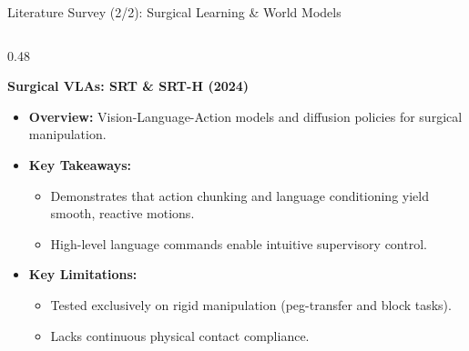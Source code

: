 \documentclass{if-beamer}
\begin{document}
\begin{frame}{Literature Survey (2/2): Surgical Learning \& World Models}
    \begin{columns}[T]
        \begin{column}{0.48\textwidth}
            \begin{block}{\textbf{Surgical VLAs: SRT \& SRT-H (2024)}}
                \begin{itemize}\itemsep=3pt
                    \item \textbf{Overview:} Vision-Language-Action models and diffusion policies for surgical manipulation.
                    \item \textbf{Key Takeaways:}
                    \begin{itemize}\itemsep=2pt
                        \item Demonstrates that action chunking and language conditioning yield smooth, reactive motions.
                        \item High-level language commands enable intuitive supervisory control.
                    \end{itemize}
                    \item \textcolor{accentorange}{\textbf{Key Limitations:}}
                    \begin{itemize}\itemsep=2pt
                        \item Tested exclusively on rigid manipulation (peg-transfer and block tasks).
                        \item Lacks continuous physical contact compliance.
                    \end{itemize}
                \end{itemize}
            \end{block}
        \end{column}


\end{columns}
\end{frame}
\end{document}
